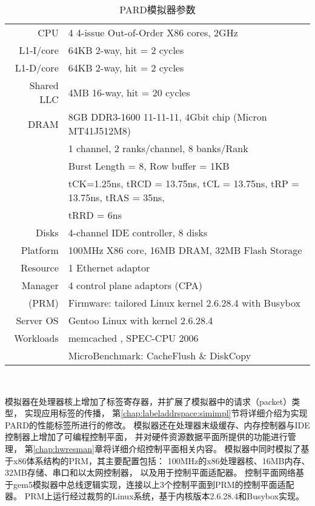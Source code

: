 \begin{table}[b]
  \centering
  \begin{minipage}[t]{0.9\linewidth}
  \caption{PARD模拟器参数}
  \label{tab:pard-sim-setup}
    \begin{tabular*}{\linewidth}{rl}
      \toprule[1.5pt]
      CPU                  & 4 4-issue Out-of-Order X86 cores, 2GHz\\
      L1-I/core            & 64KB 2-way, hit = 2 cycles \\
      L1-D/core            & 64KB 2-way, hit = 2 cycles \\
      Shared LLC           & 4MB 16-way, hit = 20 cycles \\
      \hline
      DRAM                 & 8GB DDR3-1600 11-11-11, 4Gbit chip (Micron MT41J512M8) \\
                           & 1 channel, 2 ranks/channel, 8 banks/Rank \\
                           & Burst Length = 8, Row buffer = 1KB \\
                           & tCK=1.25ns, tRCD = 13.75ns, tCL = 13.75ns, tRP = 13.75ns, tRAS = 35ns, \\
                           & tRRD = 6ns \\
      \hline
      Disks                & 4-channel IDE controller, 8 disks \\
      \hline
      Platform             & 100MHz X86 core, 16MB DRAM, 32MB Flash Storage \\
      Resource             & 1 Ethernet adaptor  \\
      Manager              & 4 control plane adaptors (CPA) \\
      (PRM)                & Firmware: tailored Linux kernel 2.6.28.4 with Busybox \cite{busybox} \\
      \hline
      Server OS            & Gentoo Linux with kernel 2.6.28.4 \\
      \hline
      Workloads            & memcached \cite{memcached}, SPEC-CPU 2006 \cite{cpu2006} \\
                           & MicroBenchmark: CacheFlush \& DiskCopy \\
      \bottomrule[1.5pt]
    \end{tabular*}\\[2pt]
  \end{minipage}
\end{table}

模拟器在处理器核上增加了标签寄存器，并扩展了模拟器中的请求（packet）类型，
实现应用标签的传播，
第\ref{chap:labeladdrspace:simimpl}节将详细介绍为实现PARD的性能标签所进行的修改。
模拟器还在处理器末级缓存、内存控制器与IDE控制器上增加了可编程控制平面，
并对硬件资源数据平面所提供的功能进行管理，
第\ref{chap:hwresman}章将详细介绍控制平面相关内容。
模拟器中同时模拟了基于x86体系结构的PRM，其主要配置包括：
100MHz的x86处理器核、16MB内存、32MB存储、串口和以太网控制器，
以及用于控制平面适配器。
控制平面网络基于gem5模拟器中总线逻辑实现，连接以上3个控制平面到PRM的控制平面适配器。
PRM上运行经过裁剪的Linux系统，基于内核版本2.6.28.4和Busybox\cite{busybox}实现。


